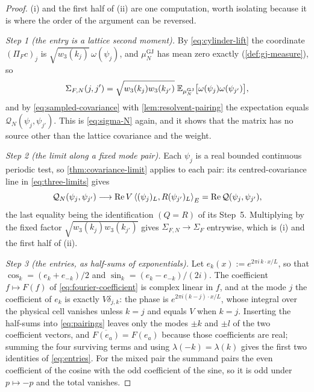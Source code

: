 \begin{proof}
(i) and the first half of (ii) are one computation, worth isolating because it
is where the order of the argument can be reversed.

\emph{Step 1 (the entry is a lattice second moment).} By
\eqref{eq:cylinder-lift} the coordinate $(\Pi_Fc)_j$ is
$\sqrt{w_3(k_j)}\,\omega(\psi_j)$, and $\mu^{\mathrm{GJ}}_N$ has mean zero
exactly (\cref{def:gj-measure}), so
\[
  \Sigma_{F,N}(j,j')
  =\sqrt{w_3(k_j)w_3(k_{j'})}\;\mathbb{E}_{\mu^{\mathrm{GJ}}_N}
     \bigl[\omega(\psi_j)\omega(\psi_{j'})\bigr],
\]
and by \eqref{eq:sampled-covariance} with \cref{lem:resolvent-pairing} the
expectation equals $\mathcal Q_N(\psi_j,\psi_{j'})$. This is \eqref{eq:sigma-N} again,
and it shows that the matrix has no source other than the lattice covariance
and the weight.

\emph{Step 2 (the limit along a fixed mode pair).} Each $\psi_j$ is a real
bounded continuous periodic test, so \cref{thm:covariance-limit} applies to
each pair: its centred-covariance line in \eqref{eq:three-limits} gives
\[
  \mathcal Q_N(\psi_j,\psi_{j'})\longrightarrow
  \operatorname{Re} V\left\langle (\psi_j)_L, R(\psi_{j'})_L \right\rangle_E=\operatorname{Re}\mathcal Q(\psi_j,\psi_{j'}),
\]
the last equality being the identification $(Q=R)$ of its Step~5. Multiplying by
the fixed factor $\sqrt{w_3(k_j)w_3(k_{j'})}$ gives
$\Sigma_{F,N}\to\Sigma_F$ entrywise, which is (i) and the first half of (ii).

\emph{Step 3 (the entries, as half-sums of exponentials).} Let
$e_k(x):=e^{2\pi i\,k\cdot x/L}$, so that $\cos_k=(e_k+e_{-k})/2$ and
$\sin_k=(e_k-e_{-k})/(2i)$. The coefficient $f\mapsto F(f)$ of
\eqref{eq:fourier-coefficient} is complex linear in $f$, and at the mode $j$
the coefficient of $e_k$ is exactly $V\delta_{j,k}$: the phase is
$e^{2\pi i(k-j)\cdot x/L}$, whose integral over the physical cell vanishes
unless $k=j$ and equals $V$ when $k=j$. Inserting the half-sums into
\eqref{eq:pairings} leaves only the modes $\pm k$ and $\pm l$ of the two
coefficient vectors, and $\overline{F(e_a)}=F(e_a)$ because those coefficients
are real; summing the four surviving terms and using $\lambda(-k)=\lambda(k)$
gives the first two identities of \eqref{eq:entries}. For the mixed pair the
summand pairs the even coefficient of the cosine with the odd coefficient of
the sine, so it is odd under $p\mapsto-p$ and the total vanishes.


\end{proof}
